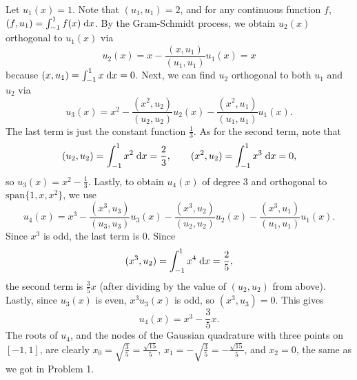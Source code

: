 \documentclass{homework}
\begin{document}
	Let $u_1(x) = 1$. Note that $(u_1, u_1) = 2$, and for any continuous function $f$, $(f, u_1) = \int_{-1}^1 f(x)\;\text{d} x$. By the Gram-Schmidt process, we obtain $u_2(x)$ orthogonal to $u_1(x)$ via
	\begin{equation}
		u_2(x) = x - \frac{(x, u_1)}{(u_1, u_1)}u_1(x) = x
	\end{equation}
	because $(x, u_1) = \int_{-1}^1x\;\text{d} x = 0$. Next, we can find $u_2$ orthogonal to both $u_1$ and $u_2$ via
	\begin{equation}
		u_3(x) = x^2 - \frac{(x^2, u_2)}{(u_2, u_2)}u_2(x) - \frac{(x^2, u_1)}{(u_1, u_1)}u_1(x).
	\end{equation}
	The last term is just the constant function $\frac{1}{3}$. As for the second term, note that
	\begin{equation}
		(u_2, u_2) = \int_{-1}^1 x^2\;\text{d} x = \frac{2}{3}, \qquad (x^2, u_2) = \int_{-1}^1x^3\;\text{d} x = 0,
	\end{equation}
	so $u_3(x) = x^2 - \frac{1}{3}$. Lastly, to obtain $u_4(x)$ of degree 3 and orthogonal to $\mathrm{span}\{1,x,x^2\}$, we use
	\begin{equation}
		u_4(x) = x^3 - \frac{(x^3, u_3)}{(u_3, u_3)}u_3(x) - \frac{(x^3, u_2)}{(u_2, u_2)}u_2(x) - \frac{(x^3, u_1)}{(u_1,u_1)}u_1(x).
	\end{equation}
	Since $x^3$ is odd, the last term is 0. Since
	\begin{equation}
		(x^3, u_2) = \int_{-1}^1 x^4\;\text{d} x = \frac{2}{5},
	\end{equation}
	the second term is $\frac{3}{5}x$ (after dividing by the value of $(u_2,u_2)$ from above). Lastly, since $u_3(x)$ is even, $x^3u_3(x)$ is odd, so $(x^3, u_3) = 0$. This gives
	\begin{equation}
		u_4(x) = x^3 - \frac{3}{5}x.
	\end{equation}
	The roots of $u_4$, and the nodes of the Gaussian quadrature with three points on $[-1,1]$, are clearly $x_0 = \sqrt{\frac{3}{5}} = \frac{\sqrt{15}}{5}$, $x_1 = -\sqrt{\frac{3}{5}} = -\frac{\sqrt{15}}{5}$, and $x_2 = 0$, the same as we got in Problem 1.
	
\end{document}
